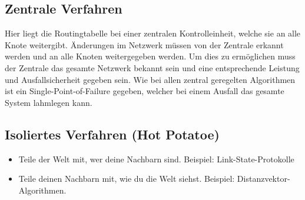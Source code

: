 \subsection{Zentrale Verfahren}
Hier liegt die Routingtabelle bei einer zentralen Kontrolleinheit, welche sie an alle Knote weitergibt. Änderungen im Netzwerk müssen von der Zentrale erkannt werden und an alle Knoten weitergegeben werden. Um dies zu ermöglichen muss der Zentrale das gesamte Netzwerk bekannt sein und eine entsprechende Leistung und Ausfallsicherheit gegeben sein. Wie bei allen zentral geregelten Algorithmen ist ein Single-Point-of-Failure gegeben, welcher bei einem Ausfall das gesamte System lahmlegen kann.

\subsection{Isoliertes Verfahren (Hot Potatoe)}

\begin{itemize}
    \item Teile der Welt mit, wer deine Nachbarn sind. Beispiel: Link-State-Protokolle
    \item Teile deinen Nachbarn mit, wie du die Welt siehst. Beispiel: Distanzvektor-Algorithmen.
\end{itemize}

